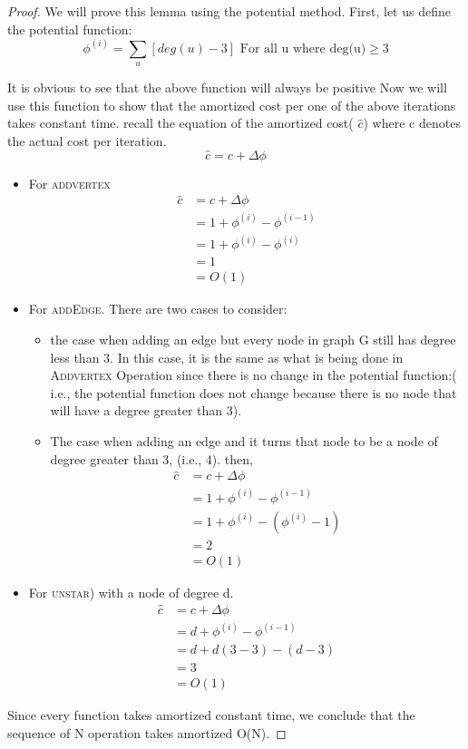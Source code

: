 \documentclass[a4paper, 11pt]{article}
\begin{document}
\begin{proof}
We will prove this lemma using the potential method. First, let us define the potential function:
$$\phi^{(i)} = \sum_{u} [deg(u)-3] \text{ For all u where deg(u)} \geq 3$$

It is obvious to see that the above function will always be positive 
Now we will use this function to show that the amortized cost per one of the above iterations takes constant time.
recall the equation of the amortized cost( $\hat{c}$) where c denotes the actual cost per iteration.
$$\hat{c} = c + \Delta \phi$$
\begin{itemize}
\item For \textsc{addvertex} 
 \begin{align*}
 \hat{c} & = c + \Delta \phi\\
 &= 1 + \phi^{(i)} -\phi^{(i-1)} \\
 &= 1 + \phi^{(i)} -\phi^{(i)} \\
 &=1\\
 & =O(1)
 \end{align*}
\item For \textsc{addEdge}. There are two cases to consider:
	\begin{itemize}
	\item the case when adding an edge but every node in graph \textsc{G} still has degree less than 3. In this case, it is the same as what is being done in \textsc{Addvertex} Operation since there is no change in the potential function:( i.e., the potential function does not change because there is no node that will have a degree greater than 3).
	\item The case when adding an edge and it turns that node to be a node of degree greater than 3, (i.e., 4). then,  
	 \begin{align*}
 \hat{c} & = c + \Delta \phi\\
 &= 1 + \phi^{(i)} -\phi^{(i-1)} \\
 &= 1 + \phi^{(i)} -(\phi^{(i)} -1)\\
 &=2
 \\
 & =O(1)
 \end{align*}
	\end{itemize}
	\item For \textsc{unstar}) with a node of degree d.
	 \begin{align*}
 \hat{c} & = c + \Delta \phi\\
 &= d + \phi^{(i)} -\phi^{(i-1)} \\
 &= d + d(3-3) -(d-3) \\
 &=3\\
 & =O(1)
 \end{align*}
\end{itemize}
Since every function takes amortized constant time, we conclude that the sequence of N operation takes amortized O(N).
\end{proof} 
\end{document}
